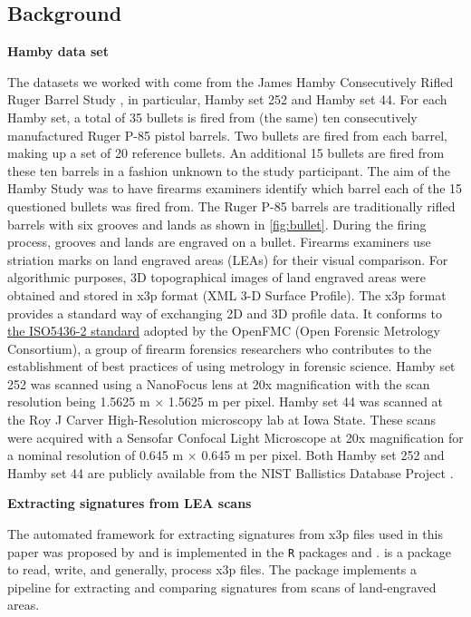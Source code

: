 \hypertarget{background}{%
\subsection{Background}\label{background}}

\textbf{Hamby data set}

The datasets we worked with come from the James Hamby Consecutively
Rifled Ruger Barrel Study \citep{brundage, hamby, Hamby:2019}, in
particular, Hamby set 252 and Hamby set 44. For each Hamby set, a total
of 35 bullets is fired from (the same) ten consecutively manufactured
Ruger P-85 pistol barrels. Two bullets are fired from each barrel,
making up a set of 20 reference bullets. An additional 15 bullets are
fired from these ten barrels in a fashion unknown to the study
participant. The aim of the Hamby Study was to have firearms examiners
identify which barrel each of the 15 questioned bullets was fired from.
The Ruger P-85 barrels are traditionally rifled barrels with six grooves
and lands as shown in \autoref{fig:bullet}. During the firing process,
grooves and lands are engraved on a bullet. Firearms examiners use
striation marks on land engraved areas (LEAs) for their visual
comparison. For algorithmic purposes, 3D topographical images of land
engraved areas were obtained and stored in x3p format (XML 3-D Surface
Profile). The x3p format provides a standard way of exchanging 2D and 3D
profile data. It conforms to
\href{http://sourceforge.net/p/open-gps/mwiki/X3p/}{the ISO5436-2
standard} adopted by the OpenFMC (Open Forensic Metrology Consortium), a
group of firearm forensics researchers who contributes to the
establishment of best practices of using metrology in forensic science.
Hamby set 252 was scanned using a NanoFocus lens at 20x magnification
with the scan resolution being 1.5625 \textmu m \(\times\) 1.5625
\textmu m per pixel. Hamby set 44 was scanned at the Roy J Carver
High-Resolution microscopy lab at Iowa State. These scans were acquired
with a Sensofar Confocal Light Microscope at 20x magnification for a
nominal resolution of 0.645 \textmu m \(\times\) 0.645 \textmu m per
pixel. Both Hamby set 252 and Hamby set 44 are publicly available from
the NIST Ballistics Database Project \citep{nistdb}.

\textbf{Extracting signatures from LEA scans}

The automated framework for extracting signatures from x3p files used in
this paper was proposed by \citet{aoas} and is implemented in the
\texttt{R} packages  \citep{x3ptools} and
 \citep{bulletxtrctr}.  is a package to
read, write, and generally, process x3p files. The 
package implements a pipeline for extracting and comparing signatures
from scans of land-engraved areas.

